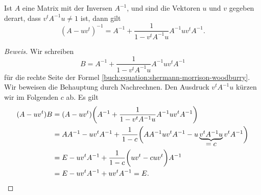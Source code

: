 \begin{satz}
\label{buch:satz:shermann}
Ist $A$ eine Matrix mit der Inversen $A^{-1}$, und sind die Vektoren
$u$ und $v$ gegeben derart, dass $v^tA^{-1}u\ne 1$ ist, dann gilt
\begin{equation}
(A-uv^t)^{-1}
=
A^{-1} + \frac{1}{1-v^tA^{-1}u} A^{-1}uv^tA^{-1}.
\label{buch:equation:shermann-morrison-woodburry}
\end{equation}
\end{satz}

\begin{proof}[Beweis]
Wir schreiben 
\[
B
=
A^{-1} + \frac{1}{1-v^tA^{-1}u} A^{-1}uv^tA^{-1}
\]
für die rechte Seite der
Formel \eqref{buch:equation:shermann-morrison-woodburry}.
Wir beweisen die Behauptung durch Nachrechnen.
Den Ausdruck $v^tA^{-1}u$ kürzen wir im Folgenden $c$ ab.
Es gilt
\begin{align*}
(A-uv^t)
B
&=
(A-uv^t)
\biggl(
A^{-1} + \frac{1}{1-v^tA^{-1}u} A^{-1}uv^tA^{-1}
\biggr)
\\
&=
AA^{-1}-uv^tA^{-1}
+
\frac{1}{1-c}
\biggl(
AA^{-1}uv^tA^{-1}
-u\underbrace{v^tA^{-1}u}_{\displaystyle=c}v^tA^{-1}
\biggr)
\\
&=
E-uv^tA^{-1}
+
\frac{1}{1-c}
\biggl(
uv^t
-cu v^t
\biggr)A^{-1}
\\
&=
E-uv^tA^{-1}
+
uv^t
A^{-1}
=
E.
\qedhere
\end{align*}
\end{proof}

